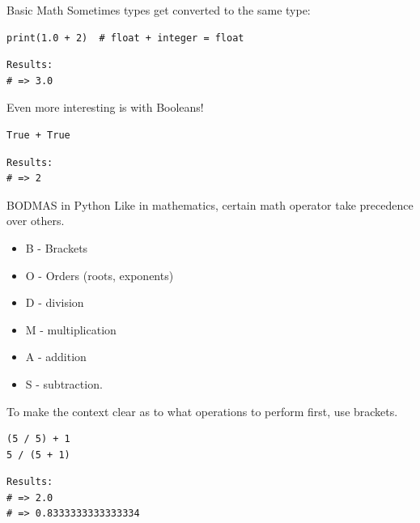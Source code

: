 \documentclass[10pt]{beamer}
\begin{document}
\begin{frame}[label={sec:org7953b04},fragile]{Basic Math}
 Sometimes types get converted to the same type:

\begin{verbatim}
print(1.0 + 2)  # float + integer = float
\end{verbatim}

\begin{verbatim}
Results: 
# => 3.0
\end{verbatim}


Even more interesting is with Booleans!

\begin{verbatim}
True + True
\end{verbatim}

\begin{verbatim}
Results: 
# => 2
\end{verbatim}
\end{frame}

\begin{frame}[label={sec:org5d31094},fragile]{BODMAS in Python}
 Like in mathematics, certain math operator take precedence over others.

\begin{itemize}
\item B - Brackets
\item O - Orders (roots, exponents)
\item D - division
\item M - multiplication
\item A - addition
\item S - subtraction.
\end{itemize}

To make the context clear as to what operations to perform first, use brackets.

\begin{verbatim}
(5 / 5) + 1
5 / (5 + 1)
\end{verbatim}

\begin{verbatim}
Results: 
# => 2.0
# => 0.8333333333333334
\end{verbatim}
\end{frame}
\end{document}
